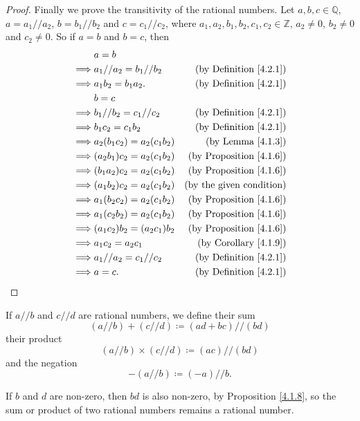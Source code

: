 \begin{proof}
Finally we prove the transitivity of the rational numbers.
Let \(a, b, c \in \mathds{Q}\), \(a = a_1 // a_2\), \(b = b_1 // b_2\) and \(c = c_1 // c_2\), where \(a_1, a_2, b_1, b_2, c_1, c_2 \in \mathds{Z}\), \(a_2 \neq 0\), \(b_2 \neq 0\) and \(c_2 \neq 0\).
So if \(a = b\) and \(b = c\), then
\begin{align*}
& a = b \\
\implies & a_1 // a_2 = b_1 // b_2 & \text{(by Definition \ref{4.2.1})} \\
\implies & a_1b_2 = b_1a_2. & \text{(by Definition \ref{4.2.1})} \\
& b = c \\
\implies & b_1 // b_2 = c_1 // c_2 & \text{(by Definition \ref{4.2.1})} \\
\implies & b_1c_2 = c_1b_2 & \text{(by Definition \ref{4.2.1})} \\
\implies & a_2(b_1c_2) = a_2(c_1b_2) & \text{(by Lemma \ref{4.1.3})} \\
\implies & (a_2b_1)c_2 = a_2(c_1b_2) & \text{(by Proposition \ref{4.1.6})} \\
\implies & (b_1a_2)c_2 = a_2(c_1b_2) & \text{(by Proposition \ref{4.1.6})} \\
\implies & (a_1b_2)c_2 = a_2(c_1b_2) & \text{(by the given condition)} \\
\implies & a_1(b_2c_2) = a_2(c_1b_2) & \text{(by Proposition \ref{4.1.6})} \\
\implies & a_1(c_2b_2) = a_2(c_1b_2) & \text{(by Proposition \ref{4.1.6})} \\
\implies & (a_1c_2)b_2 = (a_2c_1)b_2 & \text{(by Proposition \ref{4.1.6})} \\
\implies & a_1c_2 = a_2c_1 & \text{(by Corollary \ref{4.1.9})} \\
\implies & a_1 // a_2 = c_1 // c_2 & \text{(by Definition \ref{4.2.1})} \\
\implies & a = c. & \text{(by Definition \ref{4.2.1})}
\end{align*}
\end{proof}

\begin{definition}\label{4.2.2}
If \(a // b\) and \(c // d\) are rational numbers, we define their sum
\[
    (a // b) + (c // d) \coloneqq (ad + bc) // (bd)
\]
their product
\[
    (a // b) \times (c // d) \coloneqq (ac) // (bd)
\]
and the negation
\[
    -(a // b) \coloneqq (-a) // b.
\]
\end{definition}

\begin{note}
If \(b\) and \(d\) are non-zero, then \(bd\) is also non-zero, by Proposition \ref{4.1.8}, so the sum or product of two rational numbers remains a rational number.
\end{note}

